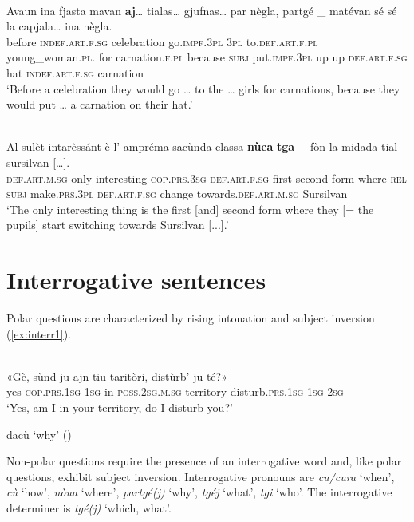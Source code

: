 \ea
\label{}
\\
\gll    Avaun ina fjasta mavan \textbf{aj}… tialas… gjufnas… par nègla, partgé \_ matévan sé sé la capjala… ina nègla.\\
before  \textsc{indef.art.f.sg} celebration go.\textsc{impf.3pl} \textsc{3pl} to.\textsc{def.art.f.pl}  young\_woman.\textsc{pl.} for carnation.\textsc{f.pl} because \textsc{subj}  put.\textsc{impf.3pl} up up  \textsc{def.art.f.sg} hat \textsc{indef.art.f.sg} carnation \\
\glt `Before a celebration they would go … to the … girls for carnations, because they would put … a carnation on their hat.'
\z

\ea
\label{}
\\
 \gll    Al sulèt intarèssánt è l’ ampréma sacùnda classa \textbf{nùca} \textbf{tga} \_ fòn la midada tial sursilvan […].\\
 \textsc{def.art.m.sg} only interesting \textsc{cop.prs.3sg} \textsc{def.art.f.sg} first second form where \textsc{rel} \textsc{subj} make.\textsc{prs.3pl} \textsc{def.art.f.sg} change towards.\textsc{def.art.m.sg} Sursilvan\\
 \glt `The only interesting thing is the first [and] second form where they [= the pupils] start switching towards Sursilvan [...].'
 \z
 

\section{Interrogative sentences}
Polar questions are characterized by rising intonation and subject inversion (\ref{ex:interr1}).

\ea
\label{ex:interr1}
\\
\gll «Gè, sùnd ju ajn tiu taritòri, distùrb’ ju té?»   \\
yes \textsc{cop.prs.1sg} \textsc{1sg} in \textsc{poss.2sg.m.sg} territory disturb.\textsc{prs.1sg} \textsc{1sg} \textsc{2sg} \\
\glt `Yes, am I in your territory, do I disturb you?'
\z

dacù `why' ()

Non-polar questions require the presence of an interrogative word and, like polar questions, exhibit subject inversion. Interrogative pronouns are \textit{cu/cura} `when', \textit{cù} `how', \textit{nòua} `where', \textit{partgé(j)} `why', \textit{tgéj} `what', \textit{tgi} `who'. The interrogative determiner is \textit{tgé(j)} `which, what'.


